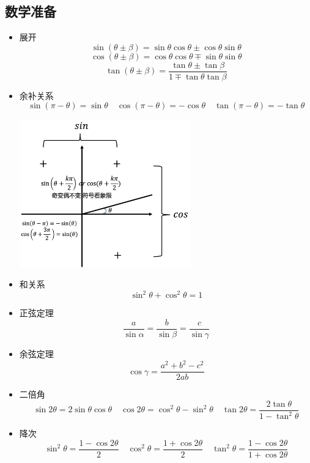 \documentclass{article}
\begin{document}
\vspace{2em}


\subsection{数学准备}
\begin{formal}
    \begin{itemize}
        \item 展开
              $$ \sin{(\theta \pm \beta)} = \sin{\theta}\cos{\theta} \pm \cos{\theta}\sin{\theta} $$
              $$ \cos{(\theta \pm \beta)} = \cos{\theta}\cos{\theta} \mp \sin{\theta}\sin{\theta} $$
              $$ \tan{(\theta \pm \beta)} = \dfrac{\tan{\theta} \pm \tan{\beta}}{1 \mp \tan{\theta}\tan{\beta}}$$

        \item 余补关系
              $$ \sin{(\pi - \theta)} = \sin{\theta} \quad \cos{(\pi - \theta)} = - \cos{\theta} \quad \tan{(\pi - \theta)} = -\tan{\theta}$$

              \includegraphics[width = 20em]{./pictures/1.png}

        \item 和关系
              $$ \sin^{2}{\theta}+\cos^{2}{\theta} = 1$$

        \item 正弦定理
              $$ \dfrac{a}{\sin{\alpha}} = \dfrac{b}{\sin{\beta}} = \dfrac{c}{\sin{\gamma}}   $$

        \item 余弦定理
              $$ \cos{\gamma} = \dfrac{a^{2}+b^{2} - c^{2}}{2ab} $$

        \item 二倍角
              $$ \sin{2\theta} = 2\sin{\theta}\cos{\theta} \quad \cos{2\theta} = \cos^{2}{\theta} - \sin^{2}{\theta} \quad \tan{2\theta} = \dfrac{2\tan{\theta}}{1-\tan^{2}{\theta}}$$

        \item 降次
              $$ \sin^{2}{\theta} = \dfrac{1 - \cos{2\theta}}{2} \quad \cos^{2}{\theta} = \dfrac{1 + \cos{2\theta}}{2} \quad \tan^{2}{\theta} = \dfrac{1-\cos{2\theta}}{1+\cos{2\theta}}$$
    \end{itemize}
\end{formal}
\end{document}
